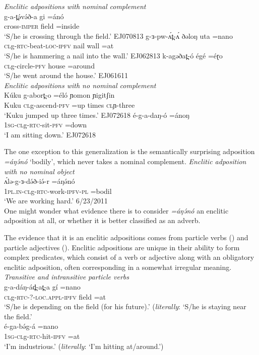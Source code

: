 \ea \textit{Enclitic adpositions with nominal complement}\\
\ea \gll g-a-t̪ə́və́ð-a gi ={ánó}\\
cross-\textsc{imper} field ={inside}\\
\glt	`S/he is crossing through the field.' \hfill EJ070813
\ex \gll g-ɜ-pw-ʌ́t̪-ʌ́ ðəloŋ uta =nano\\
\textsc{cl}g-\textsc{rtc}-beat-\textsc{loc}-\textsc{ipfv} nail wall {=at}\\
\glt `S/he is hammering a nail into the wall.' \hfill EJ062813
\ex \gll k-agəðat̪-ó égé {=éɽo}\\
\textsc{cl}g-circle-\textsc{pfv} house =around\\
\glt	`S/he went around the house.'		\hfill EJ061611\\
\z 
\ex \textit{Enclitic adpositions with no nominal complement}\\
\ea \gll Kúku g-abort̪-o =éló ɲomon ɲigitʃin \\
Kuku \textsc{cl}g-ascend-\textsc{pfv} =up times \textsc{cl}ɲ-three \\
\glt `Kuku jumped up three times.' \hfill	EJ072618
\ex \gll é-g-a-daŋ-ó =ánoŋ \\
\textsc{1sg-cl}g-\textsc{rtc}-sit-\textsc{pfv} =down {}\\
\glt `I am sitting down.' \hfill	EJ072618
\z
\z

The one exception to this generalization is the semantically surprising adposition \textit{=áŋə́nó} `bodily', which never takes a nominal complement.
\ea \textit{Enclitic adposition with no nominal object}\\
 \gll ʌ́lə-g-ɜ-də́ð-iə́-r =áŋə́nó\\
\textsc{1pl.in-cl}g-\textsc{rtc-}work-\textsc{ipfv-pl} =bodil\\
\glt `We are working hard.'		\hfill 6/23/2011\\
\z
One might wonder what evidence there is to consider \textit{=áŋə́nó} an enclitic adposition at all, or whether it is better classified as an adverb. 

The evidence that it is an enclitic adpositions comes from particle verbs () and particle adjectives (). Enclitic adpositions are unique in their ability to form complex predicates, which consist of a verb or adjective along with an obligatory enclitic adposition, often corresponding in a somewhat irregular meaning. 
\ea \textit{Transitive and intransitive particle verbs}\\
\ea \gll g-a-dáŋ-ád̪-at̪-a gí =nano\\
 \textsc{cl}g-\textsc{rtc}-?-\textsc{loc.appl-ipfv} field =at\\
\glt	`S/he is depending on the field (for his future).' (\textit{literally}: `S/he is staying near the field.'\\
\ex \gll é-ga-bə́g-á =nano\\
\textsc{1sg-cl}g-\textsc{rtc}-hit-\textsc{ipfv} =at\\
\glt	`I’m industrious.' (\textit{literally}: `I'm hitting at/around.')
\z 
\z 


